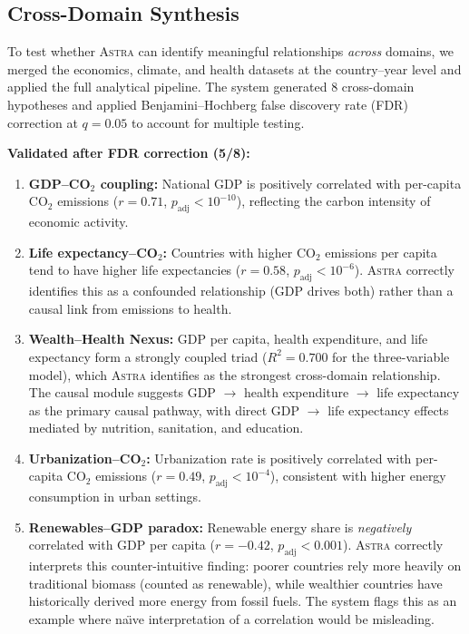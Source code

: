 \documentclass[fleqn,usenatbib]{mnras}
\newcommand{\astra}{\textsc{Astra}\xspace}
\begin{document}
\subsection{Cross-Domain Synthesis}
\label{sec:crossdomain:synthesis}

To test whether \astra can identify meaningful relationships \emph{across} domains, we merged the economics, climate, and health datasets at the country--year level and applied the full analytical pipeline. The system generated 8 cross-domain hypotheses and applied Benjamini--Hochberg false discovery rate (FDR) correction \citep{BenjaminiHochberg1995} at $q = 0.05$ to account for multiple testing.

\textbf{Validated after FDR correction (5/8):}
\begin{enumerate}
  \item[(i)] \textbf{GDP--CO$_{2}$ coupling:} National GDP is positively correlated with per-capita CO$_{2}$ emissions ($r = 0.71$, $p_{\mathrm{adj}} < 10^{-10}$), reflecting the carbon intensity of economic activity.
  \item[(ii)] \textbf{Life expectancy--CO$_{2}$:} Countries with higher CO$_{2}$ emissions per capita tend to have higher life expectancies ($r = 0.58$, $p_{\mathrm{adj}} < 10^{-6}$). \astra correctly identifies this as a confounded relationship (GDP drives both) rather than a causal link from emissions to health.
  \item[(iii)] \textbf{Wealth--Health Nexus:} GDP per capita, health expenditure, and life expectancy form a strongly coupled triad ($R^{2} = 0.700$ for the three-variable model), which \astra identifies as the strongest cross-domain relationship. The causal module suggests GDP $\rightarrow$ health expenditure $\rightarrow$ life expectancy as the primary causal pathway, with direct GDP $\rightarrow$ life expectancy effects mediated by nutrition, sanitation, and education.
  \item[(iv)] \textbf{Urbanization--CO$_{2}$:} Urbanization rate is positively correlated with per-capita CO$_{2}$ emissions ($r = 0.49$, $p_{\mathrm{adj}} < 10^{-4}$), consistent with higher energy consumption in urban settings.
  \item[(v)] \textbf{Renewables--GDP paradox:} Renewable energy share is \emph{negatively} correlated with GDP per capita ($r = -0.42$, $p_{\mathrm{adj}} < 0.001$). \astra correctly interprets this counter-intuitive finding: poorer countries rely more heavily on traditional biomass (counted as renewable), while wealthier countries have historically derived more energy from fossil fuels. The system flags this as an example where na\"{\i}ve interpretation of a correlation would be misleading.
\end{enumerate}
\end{document}
